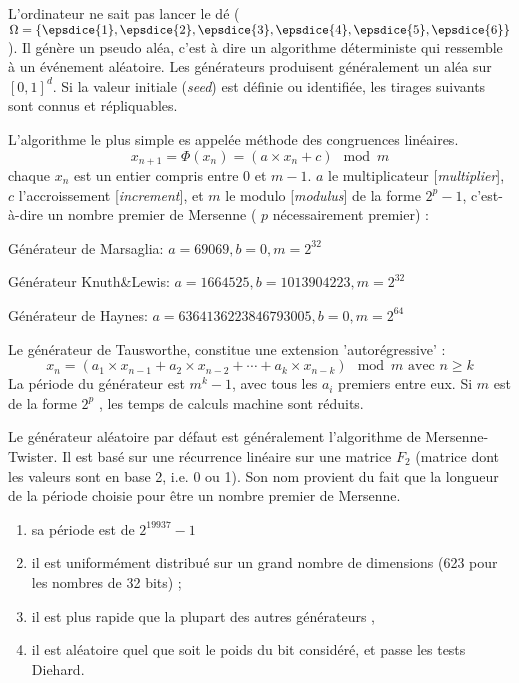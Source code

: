 \begin{f}
L'ordinateur ne sait pas lancer le dé ($\Omega=\{ \epsdice{1}, \epsdice{2}, \epsdice{3}, \epsdice{4}, \epsdice{5}, \epsdice{6} \}$).
Il génère un pseudo aléa, c'est à dire un algorithme déterministe qui ressemble à un événement aléatoire.
Les générateurs produisent généralement un aléa sur $[0,1]^d$.
Si la valeur initiale (\emph{seed}) est définie ou identifiée, les tirages suivants sont connus et répliquables.


L'algorithme le plus simple es  appelée méthode des congruences linéaires.
$$
x_{n+1}=\Phi(x_n)= (a\times x_n+c) \mod m
$$ \small
chaque $x_n$ est un entier compris entre 0 et $m-1$.
$a$ le multiplicateur [\emph{multiplier}], $c$ l'accroissement [\emph{increment}], et $m$ le modulo [\emph{modulus}] de la forme $2^p-1$, c'est-à-dire un nombre premier de Mersenne ( $ p $ nécessairement premier) :

Générateur de Marsaglia: $a=69069, b=0, m=2^{32}$

Générateur Knuth\&Lewis: $a=1664525, b=1013904223, m=2^{32}$

Générateur de Haynes: $a=6364136223846793005, b=0, m=2^{64}$

Le générateur de Tausworthe, constitue une extension 'autorégressive' :
$$
x_{n}=(a_{1}\times x_{n-1}+a_{2}\times x_{n-2}+\cdots +a_{k}\times x_{n-k}) \mod m \text{ avec } n\geq k
$$
La période du générateur est $m^k-1$, avec tous les $a_i$ premiers entre eux. Si $m$ est de la forme $2^p$ , les temps de calculs machine sont réduits. 


Le générateur aléatoire par défaut est généralement l'algorithme de Mersenne-Twister. Il est basé sur une récurrence linéaire sur une matrice $F_{2}$ (matrice dont les valeurs sont en base 2, i.e. 0 ou 1). 
Son nom provient du fait que la longueur de la période choisie pour être un nombre premier de Mersenne. 
\begin{enumerate}
	\item     sa période est de $2^{19937}-1 $
	\item     il est uniformément distribué sur un grand nombre de dimensions (623 pour les nombres de 32 bits) ;
	\item     il est plus rapide que la plupart des autres générateurs ,
	\item     il est aléatoire quel que soit le poids du bit considéré, et passe les tests Diehard.
\end{enumerate}
\end{f}
%

